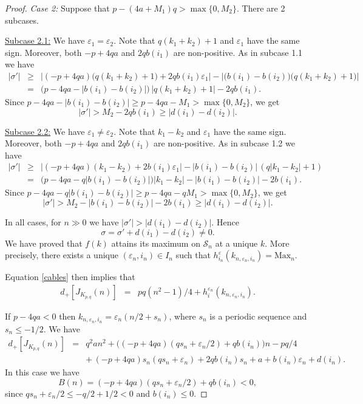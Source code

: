 \documentclass[11pt]{amsart}
\theoremstyle{definition}
\def\CS{\mathcal S}
\def\ve{\varepsilon}
\begin{document}
\begin{proof}
\medskip 

\textit{Case 2:} Suppose that $p- (4a + M_1)q > \max\{0, M_2\}$. There are 2 subcases.
\smallskip

\underline{Subcase 2.1:} We have $\ve_1 = \ve_2$. Note that $q(k_1+k_2)+1$ and $\ve_1$ have the same sign. Moreover, both $-p+4qa$ and $2qb(i_1)$ are non-positive. As in subcase 1.1 we have 
\begin{eqnarray*}
|\sigma'| &\ge& \big| (-p+4qa) \big( q(k_1+k_2)+1 \big) + 2qb(i_1)\ve_1 \big| - \big| \big( b(i_1) - b(i_2) \big) \big( q(k_1+k_2)+1 \big) \big| \\
&=& \big( p - 4qa - |b(i_1) - b(i_2)| \big) \, |q(k_1+k_2)+1| - 2q b(i_1).
\end{eqnarray*}
Since $p - 4qa - |b(i_1) - b(i_2)|  \ge p - 4qa - M_1 > \max \{0, M_2\}$, we get 
$$|\sigma'| > M_2  -2 q b(i_1) \ge |d(i_1) - d(i_2)|.$$
\smallskip

\underline{Subcase 2.2:} We have $\ve_1 \not= \ve_2$. Note that $k_1 - k_2$ and $\ve_1$ have the same sign. Moreover, both $-p+4qa$ and $2qb(i_1)$ are non-positive. As in subcase 1.2 we have
\begin{eqnarray*}
|\sigma'| &\ge& \big|  (-p+4qa)(k_1 - k_2) + 2b(i_1)\ve_1 \big| -  | b(i_1) - b(i_2)| \, ( q|k_1 - k_2| + 1) \\
&=& \big( p - 4qa - q |b(i_1) - b(i_2)| \big) |k_1 - k_2| - | b(i_1) - b(i_2)|  - 2 b(i_1).
\end{eqnarray*}
Since $p - 4qa - q |b(i_1) - b(i_2)| \ge p - 4qa - q M_1 > \max\{0, M_2\}$, we get $$|\sigma'| > M_2 -  | b(i_1) - b(i_2)|  -2 b(i_1) \ge |d(i_1) - d(i_2)|.$$

In all cases, for $n \gg 0$ we have $|\sigma'| > |d(i_1)-d(i_2)|.$ Hence $$\sigma = \sigma' + d(i_1) - d(i_2) \not= 0.$$
We have proved that $f(k)$ attains its maximum on $\CS_n$ at a unique $k$. More precisely, there exists a unique $(\ve_n, i_n) \in I_n$ such that $h_{i_n}^{\ve}(k_{n, \ve_n, i_n}) = \text{Max}_n$. 

Equation \eqref{cables} then implies that  
\begin{eqnarray*}
d_+[J_{K_{p,q}}(n)] &=& pq(n^2-1)/4 + h^{\ve_n}_{i}(k_{n,\ve_n,i_n}).
\end{eqnarray*}

If $p - 4qa < 0$ then $k_{n,\ve_n,i_n} = \ve_n (n/2 + s_n)$, where $s_n$ is a periodic sequence and $s_n \le -1/2$. We have
\begin{eqnarray*}
d_+[J_{K_{p,q}}(n)] &=& q^2a n^2 + \big( (-p + 4qa) (q s_n + \ve_n /2) + qb(i_n) \big) n -  pq/4 \\
&& + \, (-p + 4qa)s_n (q s_n + \ve_n) + 2q b(i_n) s_n+  a + b(i_n) \ve_n + d(i_n).
\end{eqnarray*}
In this case we have $$B(n)=(-p + 4qa) (q s_n + \ve_n /2) + qb(i_n) < 0,$$ since $q s_n + \ve_n /2 \le -q/2 + 1/2 <0$ and $b(i_n) \le 0$.


\end{proof}
\end{document}
